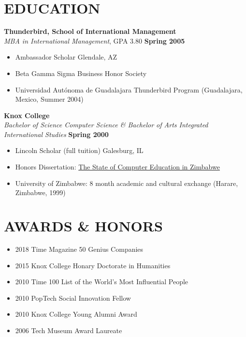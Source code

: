 \documentclass{res}
\begin{document}
\begin{resume}
\section{EDUCATION} 
\vspace{8pt} 
\textbf{Thunderbird, School of International Management}  \\
\emph{MBA in International Management}, GPA 3.80 \hfill \textbf{Spring 2005}
   \begin{itemize} \itemsep -2pt %
		\item Ambassador Scholar \hfill Glendale, AZ
		\item Beta Gamma Sigma Business Honor Society
		\item Universidad Autónoma de Guadalajara Thunderbird Program (Guadalajara, Mexico, Summer 2004)  
	\end{itemize} \vspace{-6pt}

	\vspace{8pt} 
	\textbf{Knox College}  \\
	\emph{Bachelor of Science Computer Science \& Bachelor of Arts Integrated International Studies} \hfill \textbf{Spring 2000}
	   \begin{itemize} \itemsep -2pt %
			\item Lincoln Scholar (full tuition)   \hfill Galesburg, IL
			\item Honors Dissertation: \underline{The State of Computer Education in Zimbabwe} 
			\item University of Zimbabwe: 8 month academic and cultural exchange (Harare, Zimbabwe, 1999)
		\end{itemize}


\section{AWARDS \& HONORS}
\begin{itemize} \itemsep -2pt
	\item 2018 Time Magazine 50 Genius Companies
	\item 2015 Knox College Honary Doctorate in Humanities
	\item 2010 Time 100 List of the World's Most Influential People
	\item 2010 PopTech Social Innovation Fellow
    \item 2010 Knox College Young Alumni Award
	\item 2006 Tech Museum Award Laureate
\end{itemize}


\end{resume}
\end{document}
